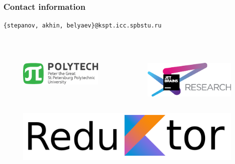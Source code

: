 
\begin{frame}[fragile]
\frametitle{Contact information}
\texttt{\{stepanov, akhin, belyaev\}@kspt.icc.spbstu.ru} \\ \ \\ \ \\
\begin{columns} 
	\begin{figure}
		\includegraphics[width=0.99\linewidth]{image/polytech_logo_en} 
	\end{figure}
	\begin{figure}
		\includegraphics[width=0.99\linewidth]{image/jetbrainsLogo} 
	\end{figure}
\end{columns}
	\begin{figure}
		\includegraphics[width=0.4\linewidth]{image/Reduktor} 
	\end{figure}
\end{frame}